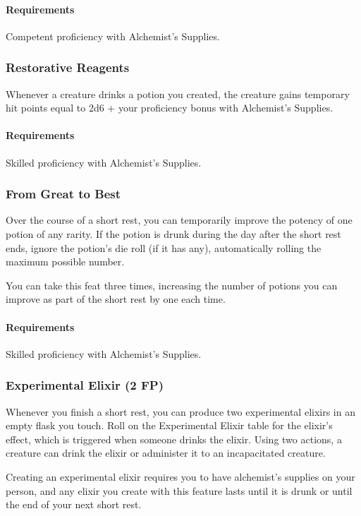     \paragraph{Requirements} Competent proficiency with Alchemist's Supplies.
\subsubsection{Restorative Reagents} \label{feat::restorativereagents}
    Whenever a creature drinks a potion you created, the creature gains temporary hit points equal to 2d6 + your proficiency bonus with Alchemist's Supplies.
    \paragraph{Requirements} Skilled proficiency with Alchemist's Supplies.
\subsubsection{From Great to Best} \label{feat::fromgreattobest}
    Over the course of a short rest, you can temporarily improve the potency of one potion of any rarity.
    If the potion is drunk during the day after the short rest ends, ignore the potion's die roll (if it has any), automatically rolling the maximum possible number.

    You can take this feat three times, increasing the number of potions you can improve as part of the short rest by one each time.
    \paragraph{Requirements} Skilled proficiency with Alchemist's Supplies.
\subsubsection{Experimental Elixir (2 FP)} \label{feat::experimentalelixir}
    Whenever you finish a short rest, you can produce two experimental elixirs in an empty flask you touch.
    Roll on the Experimental Elixir table for the elixir's effect, which is triggered when someone drinks the elixir.
    Using two actions, a creature can drink the elixir or administer it to an incapacitated creature.

    Creating an experimental elixir requires you to have alchemist's supplies on your person, and any elixir you create with this feature lasts until it is drunk or until the end of your next short rest.

